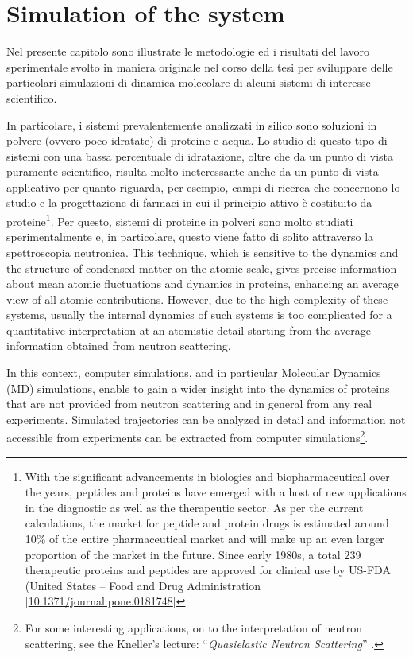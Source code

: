 \chapter{Simulation of the system}
Nel presente capitolo sono illustrate le metodologie ed i risultati del lavoro sperimentale svolto in maniera originale nel corso della tesi per sviluppare delle particolari simulazioni di dinamica molecolare di alcuni sistemi di interesse scientifico.

In particolare, i sistemi prevalentemente analizzati in silico sono soluzioni in polvere (ovvero poco idratate) di proteine e acqua. Lo studio di questo tipo di sistemi con una bassa percentuale di idratazione, oltre che da un punto di vista puramente scientifico, risulta molto ineteressante anche da un punto di vista applicativo per quanto riguarda, per esempio, campi di ricerca che concernono lo studio e la progettazione di farmaci in cui il principio attivo è costituito da proteine\footnote{With the significant advancements in biologics and biopharmaceutical over the years, peptides and proteins have emerged with a host of new applications in the diagnostic as well as the therapeutic sector. As per the current calculations, the market for peptide and protein drugs is estimated around 10\% of the entire pharmaceutical market and will make up an even larger proportion of the market in the future. Since early 1980s, a total 239 therapeutic proteins and peptides are approved for clinical use by US-FDA (United States -- Food and Drug Administration [\url{10.1371/journal.pone.0181748}]}. 
Per questo, sistemi di proteine in polveri sono molto studiati sperimentalmente e, in particolare, questo viene fatto di solito attraverso la spettroscopia neutronica.
This technique, which is sensitive to the dynamics and the structure of condensed matter on the atomic scale, gives precise information about mean atomic fluctuations and dynamics in proteins, enhancing an average view of all atomic contributions.
However, due to the high complexity of these systems, usually the internal dynamics of such systems is too complicated for a quantitative interpretation at an atomistic detail starting from the average information obtained from neutron scattering.

In this context, computer simulations, and in particular Molecular Dynamics (MD) simulations, enable to gain a wider insight into the dynamics of proteins that are not provided from neutron scattering and in general from any real experiments. 
Simulated trajectories can be analyzed in detail and information not accessible from experiments can be extracted from computer simulations\footnote{For some interesting applications, on to the interpretation of neutron scattering, see the Kneller's lecture: ``\textit{Quasielastic Neutron Scattering}'' \cite{ref:QNS_Keller}.}.

